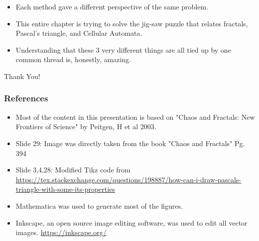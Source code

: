 \documentclass{beamer}
\begin{document}
\begin{frame}
    \begin{itemize}
        \item Each method gave a different perspective of the same problem.
        \item This entire chapter is trying to solve the jig-saw puzzle that relates fractals, Pascal's triangle, and Cellular Automata. 
        \item Understanding that these 3 very different things are all tied up by one common thread is, honestly, amazing.
    \end{itemize}
\end{frame}

\begin{frame}
    \centering 
    \Huge{Thank You!}
\end{frame}



\begin{frame}
    \frametitle{References}
    \begin{itemize}
        \item Most of the content in this presentation is based on "Chaos and Fractals: New Frontiers of Science" by Peitgen, H et al
        2003.
        \item Slide 29: Image was directly taken from the book "Chaos and Fractals" Pg. 394
        \item Slide 3,4,28: Modified Tikz code from \url{https://tex.stackexchange.com/questions/198887/how-can-i-draw-pascals-triangle-with-some-its-properties}
        \item Mathematica was used to generate most of the figures.
        \item Inkscape, an open source image editing software, was used to edit all vector images. \url{https://inkscape.org/}
    \end{itemize}
\end{frame}
\end{document}
